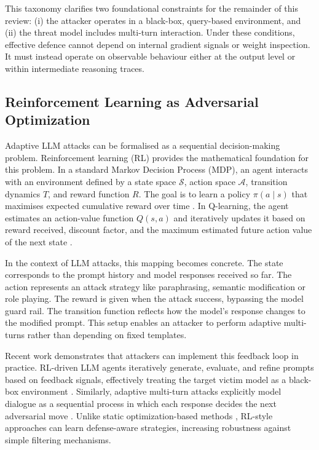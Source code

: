 \documentclass[conference]{IEEEtran}
\begin{document}
This taxonomy clarifies two foundational constraints for the remainder of this review: (i) the attacker operates in a black-box, query-based environment, and (ii) the threat model includes multi-turn interaction. Under these conditions, effective defence cannot depend on internal gradient signals or weight inspection. It must instead operate on observable behaviour either at the output level or within intermediate reasoning traces.

\subsection{Reinforcement Learning as Adversarial Optimization}

Adaptive LLM attacks can be formalised as a sequential decision-making problem. Reinforcement learning (RL) provides the mathematical foundation for this problem. In a standard Markov Decision Process (MDP), an agent interacts with an environment defined by a state space $\mathcal{S}$, action space $\mathcal{A}$, transition dynamics $T$, and reward function $R$. The goal is to learn a policy $\pi(a\mid s)$ that maximises expected cumulative reward over time \cite{b5}. In Q-learning, the agent estimates an action-value function $Q(s,a)$ and iteratively updates it based on reward received, discount factor, and the maximum estimated future action value of the next state \cite{b5}.

In the context of LLM attacks, this mapping becomes concrete. The state corresponds to the prompt history and model responses received so far. The action represents an attack strategy like paraphrasing, semantic modification or role playing. The reward is given when the attack success, bypassing the model guard rail. The transition function reflects how the model's response changes to the modified prompt. This setup enables an attacker to perform adaptive multi-turns rather than depending on fixed templates.

Recent work demonstrates that attackers can implement this feedback loop in practice. RL-driven LLM agents iteratively generate, evaluate, and refine prompts based on feedback signals, effectively treating the target victim model as a black-box environment \cite{b14}. Similarly, adaptive multi-turn attacks explicitly model dialogue as a sequential process in which each response decides the next adversarial move \cite{b15,b16}. Unlike static optimization-based methods \cite{b10}, RL-style approaches can learn defense-aware strategies, increasing robustness against simple filtering mechanisms.
\end{document}
